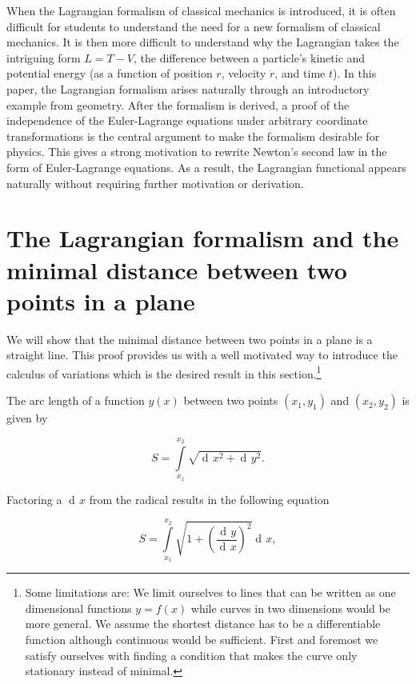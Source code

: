 \documentclass{article}
\DeclareMathOperator{\dd}{d\!}
\begin{document}
When the Lagrangian formalism of classical mechanics is introduced, it is often difficult for students to understand the need for a new formalism of classical mechanics. It is then more difficult to understand why the Lagrangian takes the intriguing form $L=T-V$, the difference between a particle's kinetic and potential energy (as a function of position $r$, velocity $\dot{r}$, and time $t$). In this paper, the Lagrangian formalism arises naturally through an introductory example from geometry. After the formalism is derived, a proof of the independence of the Euler-Lagrange equations under arbitrary coordinate transformations is the central argument to make the formalism desirable for physics. This gives a strong motivation to rewrite Newton's second law in the form of Euler-Lagrange equations. As a result, the Lagrangian functional appears naturally without requiring further motivation or derivation.

\section{The Lagrangian formalism and the minimal distance between two points in a plane \cite{Klopper}}\label{distance}

We will show that the minimal distance between two points in a plane is a straight line. This proof provides us with a well motivated way to introduce the calculus of variations which is the desired result in this section.\footnote{Some limitations are:
We limit ourselves to lines that can be written as one dimensional functions $y=f(x)$ while curves in two dimensions would be more general. We assume the shortest distance has to be a differentiable function although continuous would be sufficient. First and foremost we satisfy ourselves with finding a condition that makes the curve only stationary instead of minimal.}

The arc length of a function $y(x)$ between two points $(x_1,y_1)$ and $(x_2,y_2)$ is given by

\begin{equation}
S=\int\limits_{x_1}^{x_2}\sqrt{\dd x^2 + \dd y^2}.
\end{equation}

Factoring a $\dd x$ from the radical results in the following equation

\begin{equation}
S= \int\limits_{x_1}^{x_2}\sqrt{1 + \left(\frac{\dd y}{\dd x}\right)^2} \dd x,
\end{equation}
\end{document}
